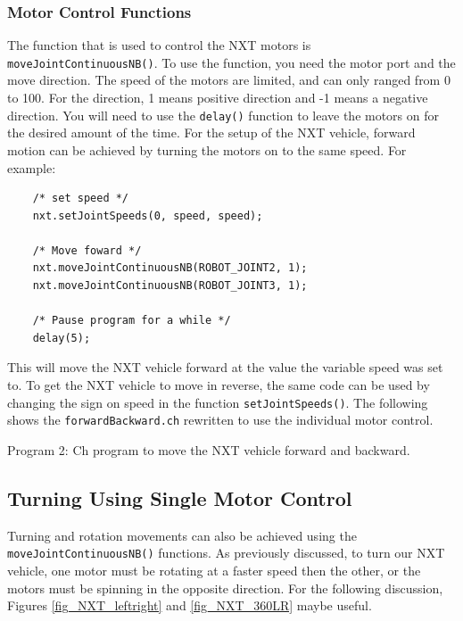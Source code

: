 \subsubsection{Motor Control Functions}
The function that is used to control the NXT motors is 
\verb+moveJointContinuousNB()+. To use the function, you need the
motor port and the move direction. The speed of the motors are 
limited, and can only ranged from 0 to 100. For the direction, 1 
means positive direction and -1 means a negative direction. You 
will need to use the \verb+delay()+ function to leave the motors 
on for the desired amount of the time. For the setup of the NXT 
vehicle, forward motion can be achieved by turning the motors on 
to the same speed. For example:
\begin{verbatim}
    /* set speed */
    nxt.setJointSpeeds(0, speed, speed);

    /* Move foward */
    nxt.moveJointContinuousNB(ROBOT_JOINT2, 1);
    nxt.moveJointContinuousNB(ROBOT_JOINT3, 1);

    /* Pause program for a while */
    delay(5);
\end{verbatim}
\noindent
This will move the NXT vehicle forward at the value the variable speed was set to. To get the 
NXT vehicle to move in reverse, the same code can be used by changing the sign on speed in the 
function \verb+setJointSpeeds()+. The following shows the \verb+forwardBackward.ch+ rewritten to use 
the individual motor control.


\begin{center}
Program 2: Ch program to move the NXT vehicle forward and backward.
\end{center}

\subsection{Turning Using Single Motor Control}
Turning and rotation movements can also be achieved using the \verb+moveJointContinuousNB()+ 
functions. As previously discussed, to turn our NXT vehicle, one motor must be rotating at a faster speed then the other, 
or the motors must be spinning in the opposite direction. For the following discussion, Figures \ref{fig_NXT_leftright} 
and \ref{fig_NXT_360LR} maybe useful.\\

